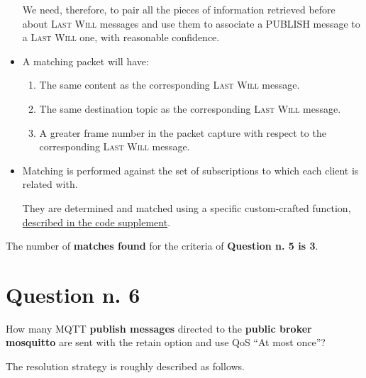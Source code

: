 \documentclass[a4paper,11pt]{article} %
\begin{document}
\begin{itemize}
        We need, therefore, to pair all the pieces of information retrieved before about \textsc{Last Will} messages and use them to associate a \textsc{PUBLISH} message to a \textsc{Last Will} one, with reasonable confidence.
        \item A matching packet will have:
        \begin{enumerate}
            \item The same content as the corresponding \textsc{Last Will} message.
            \item The same destination topic as the corresponding \textsc{Last Will} message.
            \item A greater frame number in the packet capture with respect to the corresponding \textsc{Last Will} message.
        \end{enumerate}
        \item Matching is performed against the set of subscriptions to which each client is related with.

        They are determined and matched using a specific custom-crafted function, \hyperref[subsubsec:mqtt-subscriptions]{described in the code supplement}.
    \end{itemize}

    The number of \textbf{matches found} for the criteria of \textbf{Question n. 5 is 3}.


    \section{Question n. 6}\label{sec:question-n.-6}

    How many MQTT \textbf{publish messages} directed to the \textbf{public broker mosquitto} are sent with the retain option and use QoS “At most once”?

    \medskip

    The resolution strategy is roughly described as follows.
\end{document}
